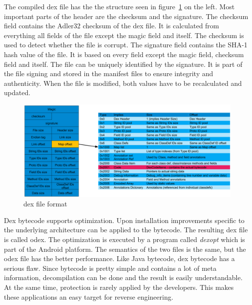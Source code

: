 The compiled \gls{dex} file has the the structure seen in figure~\ref{fig:dex} on the left.
Most important parts of the header are the checksum and the signature.
The checksum field contains the Adler32 checksum of the \gls{dex} file. It is calculated from everything all fields of the file except the magic field and itself.
The checksum is used to detect whether the file is corrupt.
The signature field contains the SHA-1 hash value of the file.
It is based on every field except the magic field, checksum field and itself.
The file can be uniquely identified by the signature.
It is part of the file signing and stored in the manifest files to ensure integrity and authenticity.
When the file is modified, both values have to be recalculated and updated.
\cite{developersDalvik} \cite{ehringerDalvik}
\newline
\begin{figure}[h]
    \centering
    \includegraphics[width=1\textwidth]{data/dex.png}
    \caption{\gls{dex} file format \cite{andevconDalvikART}}
    \label{fig:dex}
\end{figure}
Dex bytecode supports optimization.
Upon installation improvements specific to the underlying architecture can be applied to the bytecode.
The resulting \gls{dex} file is called \gls{odex}.
The optimization is executed by a program called \textit{dexopt} which is part of the Android platform.
The semantics of the two files is the same, but the \gls{odex} file has the better performance.
\newline
Like Java bytecode, \gls{dex} bytecode has a serious flaw.
Since bytecode is pretty simple and contains a lot of meta information, decompilation can be done and the result is easily understandable.
At the same time, protection is rarely applied by the developers.
This makes these applications an easy target for reverse engineering.
